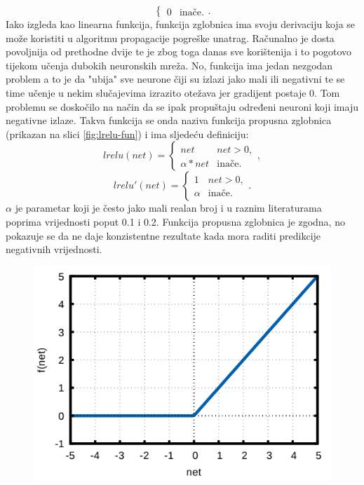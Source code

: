 \documentclass[times, utf8, zavrsni]{fer}
\begin{document}
\begin{enumerate}
\begin{equation}
\begin{cases}
            0 & \text{inače}.
        \end{cases}
        .
    \end{equation}
    Iako izgleda kao linearna funkcija, funkcija zglobnica ima svoju derivaciju koja se može koristiti u algoritmu propagacije pogreške unatrag. Računalno je dosta povoljnija od prethodne dvije te je zbog toga danas sve korištenija i to pogotovo tijekom učenja dubokih neuronskih mreža. No, funkcija ima jedan nezgodan problem a to je da "ubija" sve neurone čiji su izlazi jako mali ili negativni te se time učenje u nekim slučajevima izrazito otežava jer gradijent postaje 0. Tom problemu se doskočilo na način da se ipak propuštaju određeni neuroni koji imaju negativne izlaze. Takva funkcija se onda naziva funkcija propusna zglobnica  (prikazan na slici \ref{fig:lrelu-fun}) i ima sljedeću definiciju:
    \begin{equation}
        \label{eq:lrelu}
        lrelu(net) = 
        \begin{cases}
            net & net > 0,\\
            \alpha * net & \text{inače}.
        \end{cases}
        ,
    \end{equation}
    \begin{equation}
        \label{eq:lrelu-der}
        lrelu'(net) =
        \begin{cases}
            1 & net > 0,\\
            \alpha & \text{inače}.
        \end{cases}
        .
    \end{equation}
    $\alpha$ je parametar koji je često jako mali realan broj i u raznim literaturama poprima vrijednosti poput 0.1 i 0.2. Funkcija propusna zglobnica je zgodna, no pokazuje se da ne daje konzistentne rezultate kada mora raditi predikcije negativnih vrijednosti.
    \begin{figure}[H]
        \centering
        \includegraphics[scale=0.55]{img/relu-fun.png}

\end{figure}
\end{enumerate}
\end{document}
